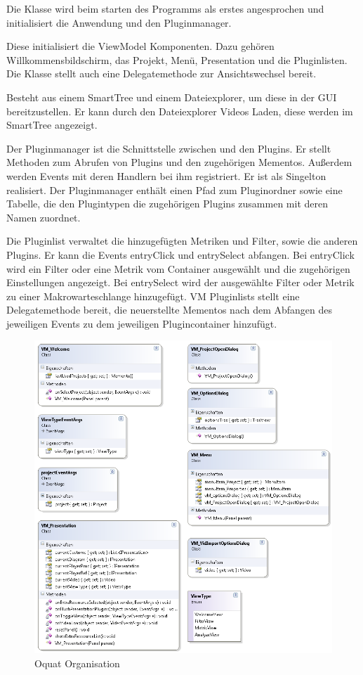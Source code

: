 Die Klasse wird beim starten des Programms als erstes angesprochen und initialisiert die Anwendung und den Pluginmanager.


Diese initialisiert die ViewModel Komponenten. Dazu gehören Willkommensbildschirm, das Projekt, Menü, Presentation und die Pluginlisten. Die Klasse stellt auch eine Delegatemethode zur Ansichtswechsel bereit.


Besteht aus einem SmartTree und einem Dateiexplorer, um diese in der GUI bereitzustellen. Er kann durch den Dateiexplorer Videos Laden, diese werden im SmartTree angezeigt.


Der Pluginmanager ist die Schnittstelle zwischen \projektTitel und den Plugins. Er stellt Methoden zum Abrufen von Plugins und den zugehörigen Mementos. Außerdem werden Events mit deren Handlern bei ihm registriert.  Er ist als Singelton realisiert. Der Pluginmanager enthält einen Pfad zum Pluginordner sowie eine Tabelle, die den Plugintypen die zugehörigen Plugins zusammen mit deren Namen zuordnet.


Die Pluginlist verwaltet die hinzugefügten Metriken und Filter, sowie die anderen Plugins. Er kann die Events entryClick und entrySelect abfangen. Bei entryClick wird ein Filter oder eine Metrik vom Container ausgewählt und die zugehörigen Einstellungen angezeigt. Bei entrySelect wird der ausgewählte Filter oder Metrik zu einer Makrowarteschlange hinzugefügt. VM Pluginlists stellt eine Delegatemethode bereit, die neuerstellte Mementos nach dem Abfangen des jeweiligen Events zu dem jeweiligen Plugincontainer hinzufügt.


\begin{figure}[H]
\noindent\includegraphics[width=\linewidth,height=\textheight,
keepaspectratio]{bilder/Klassendiagramm/VM2.png}
\caption{Oquat Organisation}
\end{figure}

